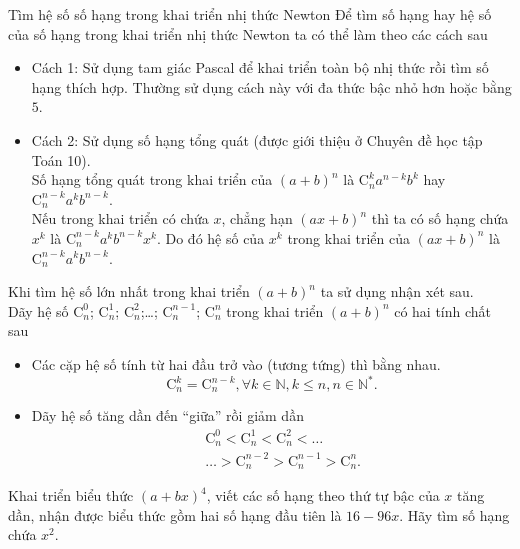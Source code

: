 \begin{dang}{Tìm hệ số số hạng trong khai triển nhị thức Newton}	
	Để tìm số hạng hay hệ số của số hạng trong khai triển nhị thức Newton ta có thể làm theo các cách sau
	\begin{itemize}
		\item Cách 1: Sử dụng tam giác Pascal để khai triển toàn bộ nhị thức rồi tìm số hạng thích hợp. Thường sử dụng cách này với đa thức bậc nhỏ hơn hoặc bằng $5$.
		\item Cách 2: Sử dụng số hạng tổng quát (được giới thiệu ở Chuyên đề học tập Toán 10).\\
		Số hạng tổng quát trong khai triển của $(a+b)^n$ là $\mathrm{C}_n^{k}a^{n-k}b^k$ hay $\mathrm{C}_n^{n-k}a^kb^{n-k}$.\\
		Nếu trong khai triển có chứa $x$, chẳng hạn $(ax+b)^n$ thì ta có số hạng chứa $x^k$ là $\mathrm{C}_n^{n-k}a^kb^{n-k}x^k$. Do đó hệ số của $x^k$ trong khai triển của $(ax+b)^n$ là $\mathrm{C}_n^{n-k}a^kb^{n-k}$.
	\end{itemize}
	Khi tìm hệ số lớn nhất trong khai triển $(a+b)^n$ ta sử dụng nhận xét sau. \\
	Dãy hệ số $\mathrm{C}_n^0$; $\mathrm{C}_n^1$; $\mathrm{C}_n^2$;\ldots ; $\mathrm{C}_n^{n-1}$; $\mathrm{C}_n^n$ trong khai triển $(a+b)^n$ có hai tính chất sau
	\begin{itemize}
		\item Các cặp hệ số tính từ hai đầu trở vào (tương tứng) thì bằng nhau.
		$$\mathrm{C}_n^k=\mathrm{C}_n^{n-k},\forall k\in\mathbb{N}, k\le n, n\in\mathbb{N}^{*}.$$
		\item Dãy hệ số tăng dần đến ``giữa'' rồi giảm dần
		\begin{eqnarray*}
			&& \mathrm{C}_n^0<\mathrm{C}_n^1<\mathrm{C}_n^2<\ldots\\
			&& \ldots >\mathrm{C}_n^{n-2}>\mathrm{C}_n^{n-1}>\mathrm{C}_n^{n}.
		\end{eqnarray*} 
	\end{itemize}
\end{dang}

\begin{vd}%
%
Khai triển biểu thức $(a+b x)^4$, viết các số hạng theo thứ tự bậc của $x$ tăng dần, nhận được biểu thức gồm hai số hạng đầu tiên là $16-96 x$. Hãy tìm số hạng chứa $x^2$.
\end{vd}

